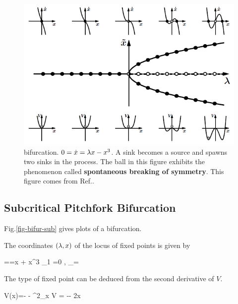 \begin{figure}[h!]
 \centering
 \includegraphics[width=5in]
 {dynamical-sys/bifur-super.png}
 \caption{\supercri bifurcation. 
 $0=\dot{x}=\lambda x  - x^3$.
 A sink becomes a source and spawns two sinks
 in the process.
 The ball in this 
 figure exhibits
 the phenomenon called 
 {\bf spontaneous breaking of symmetry}. This
 figure  comes from Ref.\cite{dynamical-fuchs}.}
 \label{fig-bifur-super}
\end{figure}
 
\subsection{Subcritical
Pitchfork Bifurcation}

Fig.\ref{fig-bifur-sub} gives plots of a \subcri
bifurcation.

The coordinates $(\lambda, x)$ of the locus 
of fixed points is given by


==\lam x  + x^3
\implies {}_1 =0
\;,\;\;
_\pm = \pm \sqrt{-\lam}
\eeq

 The type of
 fixed point can be 
 deduced from the second derivative
 of $V$.
 
\beq
V(x)=-\lam {} 
- 
\implies \partial^2_x V = -\lam - 2x
\eeq

